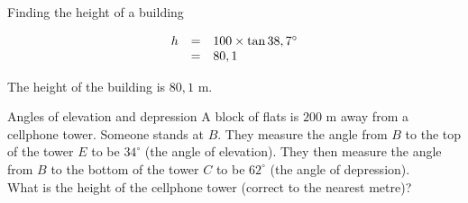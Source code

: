 \begin{wex}{Finding the height of a building}
{\begin{equation*}
\begin{array}{ccl}

\hfill h& =& 100\times \tan 38,7^{\circ }\hfill \\
& =& 80,1\hfill
  \end{array}
\end{equation*}

The height of the building is $80,1$ m.
}
\end{wex}


\begin{wex}{Angles of elevation and depression}
{A block of flats is $200$ m away from a cellphone tower. Someone stands at $B$. They measure the angle from $B$ to the top of the tower $E$ to be $34^{\circ}$ (the angle of elevation). They then measure the angle from $B$ to the bottom of the tower $C$ to be $62^{\circ}$ (the angle of depression).
\\What is the height of the cellphone tower (correct to the nearest metre)?\\

}
\end{wex}
